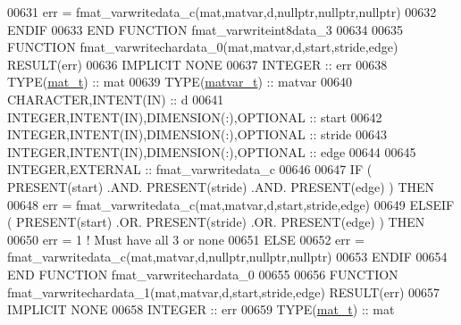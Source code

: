 \begin{DoxyCode}
00631         err = fmat\_varwritedata\_c(mat,matvar,d,nullptr,nullptr,nullptr)
00632 \textcolor{keywordflow}{    ENDIF}
00633 \textcolor{keyword}{END FUNCTION }fmat\_varwriteint8data\_3
00634 
00635 \textcolor{keyword}{FUNCTION }fmat\_varwritechardata\_0(mat,matvar,d,start,stride,edge) \textcolor{keyword}{RESULT}(err)
00636 \textcolor{keywordtype}{IMPLICIT NONE}
00637     \textcolor{keywordtype}{INTEGER}                                  :: err
00638     \textcolor{keywordtype}{TYPE}(\hyperlink{group___m_a_t_gab0fc888f5a5d79943b16284b1f91c2e8}{mat\_t})                              :: mat
00639     \textcolor{keywordtype}{TYPE}(\hyperlink{group___m_a_t_structmatvar__t}{matvar\_t})                           :: matvar
00640     \textcolor{keywordtype}{CHARACTER},\textcolor{keywordtype}{INTENT(IN)}                     :: d
00641     \textcolor{keywordtype}{INTEGER},\textcolor{keywordtype}{INTENT(IN)},\textcolor{keywordtype}{DIMENSION(:)},\textcolor{keywordtype}{OPTIONAL} :: start
00642     \textcolor{keywordtype}{INTEGER},\textcolor{keywordtype}{INTENT(IN)},\textcolor{keywordtype}{DIMENSION(:)},\textcolor{keywordtype}{OPTIONAL} :: stride
00643     \textcolor{keywordtype}{INTEGER},\textcolor{keywordtype}{INTENT(IN)},\textcolor{keywordtype}{DIMENSION(:)},\textcolor{keywordtype}{OPTIONAL} :: edge
00644 
00645     \textcolor{keywordtype}{INTEGER},\textcolor{keywordtype}{EXTERNAL}                         :: fmat\_varwritedata\_c
00646 
00647     \textcolor{keywordflow}{IF} ( \textcolor{keyword}{PRESENT}(start) .AND. \textcolor{keyword}{PRESENT}(stride) .AND. \textcolor{keyword}{PRESENT}(edge) ) \textcolor{keywordflow}{THEN}
00648         err = fmat\_varwritedata\_c(mat,matvar,d,start,stride,edge)
00649     \textcolor{keywordflow}{ELSEIF} ( \textcolor{keyword}{PRESENT}(start) .OR. \textcolor{keyword}{PRESENT}(stride) .OR. \textcolor{keyword}{PRESENT}(edge) ) \textcolor{keywordflow}{THEN}
00650         err = 1    \textcolor{comment}{! Must have all 3 or none}
00651     \textcolor{keywordflow}{ELSE}
00652         err = fmat\_varwritedata\_c(mat,matvar,d,nullptr,nullptr,nullptr)
00653 \textcolor{keywordflow}{    ENDIF}
00654 \textcolor{keyword}{END FUNCTION }fmat\_varwritechardata\_0
00655 
00656 \textcolor{keyword}{FUNCTION }fmat\_varwritechardata\_1(mat,matvar,d,start,stride,edge) \textcolor{keyword}{RESULT}(err)
00657 \textcolor{keywordtype}{IMPLICIT NONE}
00658     \textcolor{keywordtype}{INTEGER}                                  :: err
00659     \textcolor{keywordtype}{TYPE}(\hyperlink{group___m_a_t_gab0fc888f5a5d79943b16284b1f91c2e8}{mat\_t})                              :: mat

\end{DoxyCode}
